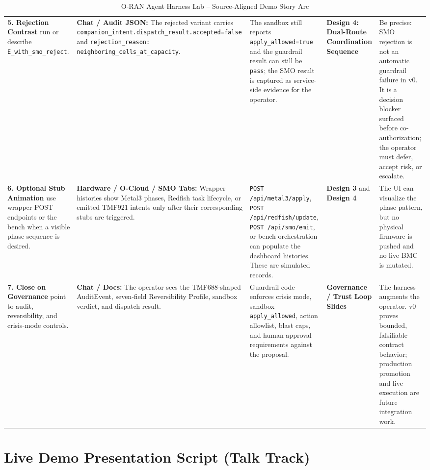 \documentclass[10pt,a4paper]{article}
\begin{document}
\begin{table}[htbp]
\begin{tabularx}{\textwidth}{p{3.0cm} p{4.2cm} p{4.3cm} p{3.2cm} X}
\addlinespace
\textbf{5. Rejection Contrast} \newline run or describe \texttt{E\_with\_smo\_reject}. & \textbf{Chat / Audit JSON:} The rejected variant carries \texttt{companion\_intent.dispatch\_result.accepted=false} and \texttt{rejection\_reason: neighboring\_cells\_at\_capacity}. & The sandbox still reports \texttt{apply\_allowed=true} and the guardrail result can still be \texttt{pass}; the SMO result is captured as service-side evidence for the operator. & \textbf{Design 4: Dual-Route Coordination Sequence} & Be precise: SMO rejection is not an automatic guardrail failure in v0. It is a decision blocker surfaced before co-authorization; the operator must defer, accept risk, or escalate. \\
\addlinespace
\textbf{6. Optional Stub Animation} \newline use wrapper POST endpoints or the bench when a visible phase sequence is desired. & \textbf{Hardware / O-Cloud / SMO Tabs:} Wrapper histories show Metal3 phases, Redfish task lifecycle, or emitted TMF921 intents only after their corresponding stubs are triggered. & \texttt{POST /api/metal3/apply}, \texttt{POST /api/redfish/update}, \texttt{POST /api/smo/emit}, or bench orchestration can populate the dashboard histories. These are simulated records. & \textbf{Design 3} and \textbf{Design 4} & The UI can visualize the phase pattern, but no physical firmware is pushed and no live BMC is mutated. \\
\addlinespace
\textbf{7. Close on Governance} \newline point to audit, reversibility, and crisis-mode controls. & \textbf{Chat / Docs:} The operator sees the TMF688-shaped AuditEvent, seven-field Reversibility Profile, sandbox verdict, and dispatch result. & Guardrail code enforces crisis mode, sandbox \texttt{apply\_allowed}, action allowlist, blast caps, and human-approval requirements against the proposal. & \textbf{Governance / Trust Loop Slides} & The harness augments the operator. v0 proves bounded, falsifiable contract behavior; production promotion and live execution are future integration work. \\
\bottomrule
\end{tabularx}
\caption{O-RAN Agent Harness Lab -- Source-Aligned Demo Story Arc}
\end{table}

\clearpage

\section{Live Demo Presentation Script (Talk Track)}
\end{document}
